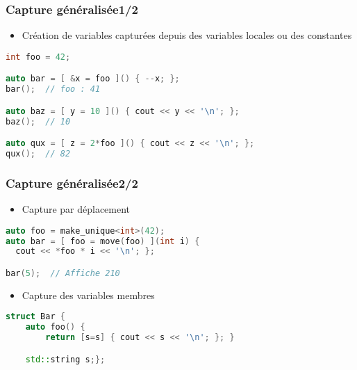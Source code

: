 \documentclass[C++.tex]{subfiles}
\begin{document}
\begin{frame}[fragile]
	\frametitle{Capture généralisée\titlehfill{}1/2}
	\begin{itemize}
		\item Création de variables capturées depuis des variables locales ou des constantes
	\end{itemize}

	\begin{lstlisting}[language=C++]
int foo = 42;

auto bar = [ &x = foo ]() { --x; };
bar();  // foo : 41

auto baz = [ y = 10 ]() { cout << y << '\n'; };
baz();  // 10

auto qux = [ z = 2*foo ]() { cout << z << '\n'; };
qux();  // 82\end{lstlisting}
\end{frame}

\begin{frame}[fragile]
	\frametitle{Capture généralisée\titlehfill{}2/2}
	\begin{itemize}
		\item Capture par déplacement
	\end{itemize}
	
	\begin{lstlisting}[language=C++]
auto foo = make_unique<int>(42);
auto bar = [ foo = move(foo) ](int i) {
  cout << *foo * i << '\n'; };

bar(5);  // Affiche 210\end{lstlisting}

	\begin{itemize}
		\item Capture des variables membres
	\end{itemize}

	\begin{lstlisting}[language=C++]
struct Bar {
	auto foo() {
		return [s=s] { cout << s << '\n'; }; }

	std::string s;};\end{lstlisting}
\end{frame}
\end{document}
